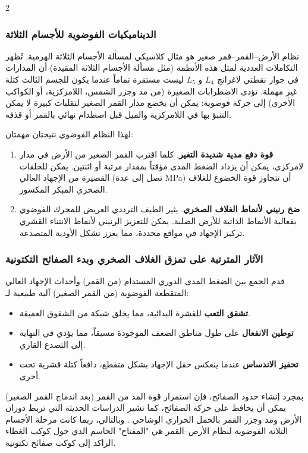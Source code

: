 \documentclass[11pt,a4paper]{article}
\begin{document}
\begin{multicols}{2}
		\subsubsection{الديناميكيات الفوضوية للأجسام الثلاثة}
		نظام الأرض–القمر–قمر صغير هو مثال كلاسيكي لمسألة الأجسام الثلاثة الهرمية. تُظهر التكاملات العددية لمثل هذه الأنظمة (مثل مسألة الأجسام الثلاثة المقيدة) أن المدارات في جوار نقطتي لاغرانج \(L_{4}\) و \(L_{5}\) ليست مستقرة تماماً عندما يكون للجسم الثالث كتلة غير مهملة. تؤدي الاضطرابات الصغيرة (من مد وجزر الشمس، اللامركزية، أو الكواكب الأخرى) إلى حركة فوضوية: يمكن أن يخضع مدار القمر الصغير لتقلبات كبيرة لا يمكن التنبؤ بها في اللامركزية والميل قبل اصطدام نهائي بالقمر أو قذفه.
		
		لهذا النظام الفوضوي نتيجتان مهمتان:
		\begin{enumerate}
			\item \textbf{قوة دفع مدية شديدة التغير}. كلما اقترب القمر الصغير من الأرض في مدار لامركزي، يمكن أن يزداد الضغط المدى مؤقتاً بمقدار مرتبة أو اثنتين. يمكن للحلقات القصيرة من الإجهاد العالي (تصل إلى عدة MPa) أن تتجاوز قوة الخضوع للغلاف الصخري المبكر المكسور.
			\item \textbf{ضخ رنيني لأنماط الغلاف الصخري}. يثير الطيف الترددي العريض للمحرك الفوضوي بفعالية الأنماط الذاتية للأرض الصلبة. يمكن للتعزيز الرنيني لأنماط الانثناء القشري تركيز الإجهاد في مواقع محددة، مما يعزز تشكل الأودية المتصدعة.
		\end{enumerate}
		
		\subsubsection{الآثار المترتبة على تمزق الغلاف الصخري وبدء الصفائح التكتونية}
		قدم الجمع بين الضغط المدى الدوري المستدام (من القمر) وأحداث الإجهاد العالي المتقطعة الفوضوية (من القمر الصغير) آلية طبيعية لـ:
		\begin{itemize}
			\item \textbf{تشقق التعب} للقشرة البدائية، مما يخلق شبكة من الشقوق العميقة.
			\item \textbf{توطين الانفعال} على طول مناطق الضعف الموجودة مسبقاً، مما يؤدي في النهاية إلى التصدع القاري.
			\item \textbf{تحفيز الاندساس} عندما ينعكس حقل الإجهاد بشكل متقطع، دافعاً كتلة قشرية تحت أخرى.
		\end{itemize}
		
		بمجرد إنشاء حدود الصفائح، فإن استمرار قوة المد من القمر (بعد اندماج القمر الصغير) يمكن أن يحافظ على حركة الصفائح، كما تشير الدراسات الحديثة التي تربط دوران الأرض ومد وجزر القمر بالحمل الحراري الوشاحي \cite{Rampino2021}. وبالتالي، ربما كانت مرحلة الأجسام الثلاثة الفوضوية لنظام الأرض–القمر هي "المفتاح" الحاسم الذي حول كوكب الغطاء الراكد إلى كوكب صفائح تكتونية.
		

\end{multicols}
\end{document}
